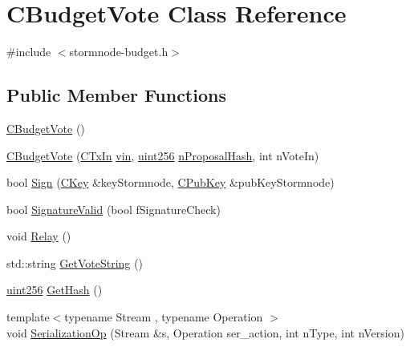 \hypertarget{class_c_budget_vote}{}\section{C\+Budget\+Vote Class Reference}
\label{class_c_budget_vote}


{\ttfamily \#include $<$stormnode-\/budget.\+h$>$}

\subsection*{Public Member Functions}
\begin{DoxyCompactItemize}
\item 
\hyperlink{class_c_budget_vote_ad9e95972416105cd86c97ddfd6a035cb}{C\+Budget\+Vote} ()
\item 
\hyperlink{class_c_budget_vote_ae6c7bba44af43bbeb1a33f830e0b352e}{C\+Budget\+Vote} (\hyperlink{class_c_tx_in}{C\+Tx\+In} \hyperlink{class_c_budget_vote_a335d3b479d57994097eccb52b50cbe53}{vin}, \hyperlink{classuint256}{uint256} \hyperlink{class_c_budget_vote_a185648d07f641e8d663afcbf7a7c1a24}{n\+Proposal\+Hash}, int n\+Vote\+In)
\item 
bool \hyperlink{class_c_budget_vote_a112c52bed648dd66fe2898e002fc3f09}{Sign} (\hyperlink{class_c_key}{C\+Key} \&key\+Stormnode, \hyperlink{class_c_pub_key}{C\+Pub\+Key} \&pub\+Key\+Stormnode)
\item 
bool \hyperlink{class_c_budget_vote_ab01d2ab30c3761318a7da919bff26697}{Signature\+Valid} (bool f\+Signature\+Check)
\item 
void \hyperlink{class_c_budget_vote_a2c761ac435fa5a5da6ccbeb308350a8f}{Relay} ()
\item 
std\+::string \hyperlink{class_c_budget_vote_a97d8f521e59d47b70203515271ecd2fc}{Get\+Vote\+String} ()
\item 
\hyperlink{classuint256}{uint256} \hyperlink{class_c_budget_vote_acb9bda3b41d3bd1ebf04ccdcb3d2d926}{Get\+Hash} ()
\item 
{\footnotesize template$<$typename Stream , typename Operation $>$ }\\void \hyperlink{class_c_budget_vote_a9899da97644defecdd4d64984cdbcd97}{Serialization\+Op} (Stream \&s, Operation ser\+\_\+action, int n\+Type, int n\+Version)
\end{DoxyCompactItemize}
